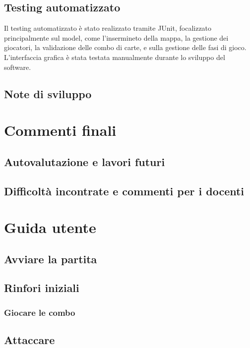 \documentclass[a4paper,12pt]{report}
\begin{document}
\section{Testing automatizzato}
Il testing automatizzato è stato realizzato tramite JUnit, focalizzato principalmente sul model, come l'insermineto della mappa, la gestione dei giocatori, la validazione delle combo di carte, e sulla gestione delle fasi di gioco.
L'interfaccia grafica è stata testata manualmente durante lo sviluppo del software.

\section{Note di sviluppo}

\chapter{Commenti finali}

\section{Autovalutazione e lavori futuri}

\section{Difficoltà incontrate e commenti per i docenti}

\appendix
\chapter{Guida utente}
\section{Avviare la partita}
\section{Rinfori iniziali}
\subsection{Giocare le combo}
\section{Attaccare}
\end{document}
